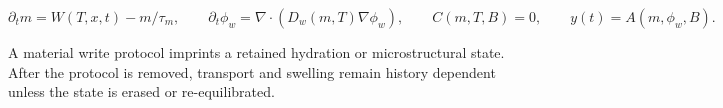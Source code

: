 \[
\partial_t m = W(T,x,t)-m/\tau_m,
\qquad
\partial_t \phi_w = \nabla\cdot(D_w(m,T)\nabla \phi_w),
\qquad
C(m,T,B)=0,
\qquad
y(t)=A(m,\phi_w,B).
\]

A material write protocol imprints a retained hydration or microstructural
state. After the protocol is removed, transport and swelling remain history
dependent unless the state is erased or re-equilibrated.
